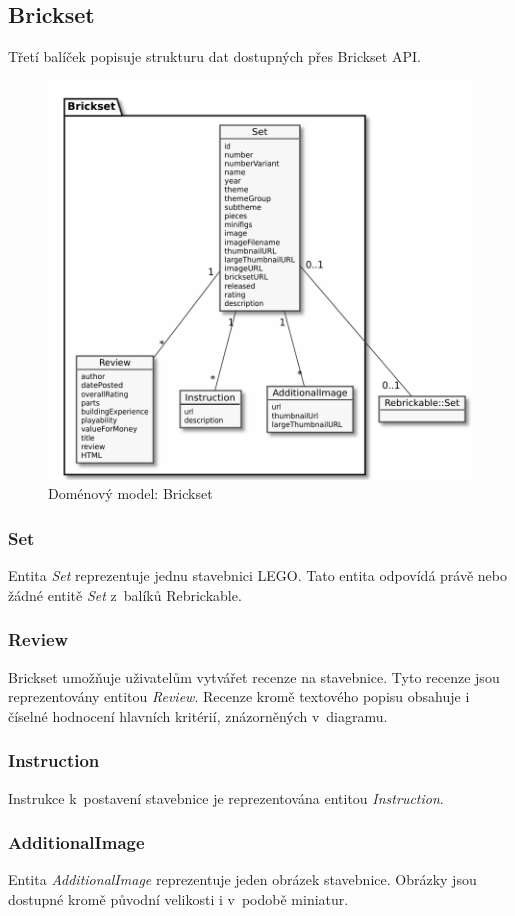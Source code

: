 \subsection{Brickset}
Třetí balíček popisuje strukturu dat dostupných přes Brickset \gls{API}.   

\begin{figure}[htbp]
    \centering
    \includegraphics[width=\textwidth,height=\textheight,keepaspectratio]{pdfs/domain_brickset}
    \caption{Doménový model: Brickset \label{diagram-domenovy-brickset}}
\end{figure}

\subsubsection*{Set}
Entita \textit{Set} reprezentuje jednu stavebnici LEGO. Tato entita odpovídá právě nebo žádné entitě \textit{Set} z~balíků Rebrickable.  

\subsubsection*{Review}
Brickset umožňuje uživatelům vytvářet recenze na stavebnice. Tyto recenze jsou reprezentovány entitou \textit{Review}. Recenze kromě textového popisu obsahuje i číselné hodnocení hlavních kritérií, znázorněných v~diagramu.

\subsubsection*{Instruction} 
Instrukce k~postavení stavebnice je reprezentována entitou \textit{Instruction}.

\subsubsection*{AdditionalImage} 
Entita \textit{AdditionalImage} reprezentuje jeden obrázek stavebnice. Obrázky jsou dostupné kromě původní velikosti i v~podobě miniatur.


